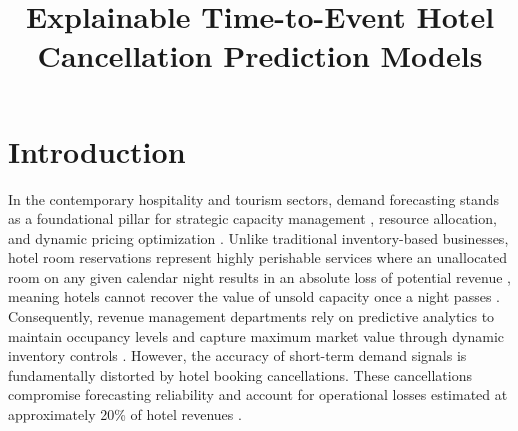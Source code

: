 \documentclass[pdflatex,sn-mathphys-ay]{sn-jnl}%
\theoremstyle{thmstyleone}%
\theoremstyle{thmstyletwo}%
\theoremstyle{thmstylethree}%
\begin{document}
\title[Article Title]{Explainable Time-to-Event Hotel Cancellation Prediction Models}

\author*[]{ }


\abstract{}


\maketitle

\section{Introduction}
\label{sec:introduction}

In the contemporary hospitality and tourism sectors, demand forecasting stands as a foundational pillar for strategic capacity management \citep{antonio2017predicting}, resource allocation, and dynamic pricing optimization \citep{ampountolas2025predicting}. Unlike traditional inventory-based businesses, hotel room reservations represent highly perishable services where an unallocated room on any given calendar night results in an absolute loss of potential revenue \citep{antonio2019big}, meaning hotels cannot recover the value of unsold capacity once a night passes \citep{mir2026decoding}. Consequently, revenue management departments rely on predictive analytics to maintain occupancy levels \citep{yoo2024predicting} and capture maximum market value through dynamic inventory controls \citep{liu2025explainable}. However, the accuracy of short-term demand signals is fundamentally distorted by hotel booking cancellations. These cancellations compromise forecasting reliability \citep{liu2023hospitality, luo2025hotel} and account for operational losses estimated at approximately 20\% of hotel revenues \citep{falk2018modelling}.
\end{document}
